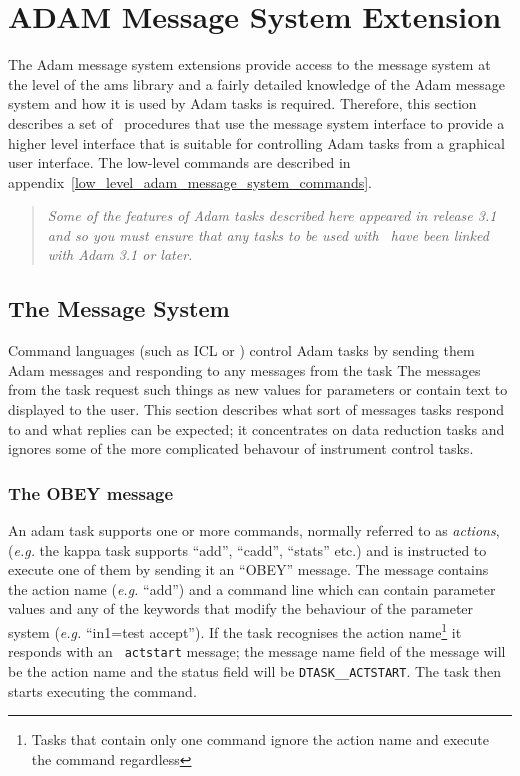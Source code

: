 \section{\label{adam_message_system_extension}ADAM Message System Extension}

The Adam message system extensions provide access to the message system 
at the level of the ams library and a fairly detailed knowledge 
of the Adam message system and how it is used by Adam tasks is required. 
Therefore, this section describes a set of \Tcl\ procedures that use the 
message system interface to provide a higher level interface that is 
suitable for controlling Adam tasks from a graphical user interface. The 
low-level commands are described in
appendix~\ref{low_level_adam_message_system_commands}.

\begin{quote}
{\em Some of the features of Adam tasks described here appeared in release
3.1 and so you must ensure that any tasks to be used with \Tcl\ have been
linked with Adam 3.1 or later.}
\end{quote}

\subsection{\label{message_system}The Message System}

Command languages (such as ICL or \TclTk ) control Adam tasks by
sending them Adam messages and responding to any messages from the task
The messages from the task request such things as new values for
parameters or contain text to displayed to the user.  This section
describes what sort of messages tasks respond to and what replies can
be expected; it concentrates on data reduction tasks and ignores some
of the more complicated behavour of instrument control tasks.

\subsubsection{The OBEY message}

An adam task supports one or more commands, normally referred to as
{\em actions}, ({\em{e.g.}} the kappa task supports ``add'', ``cadd'',
``stats'' etc.) and is instructed to execute one of them by sending it
an ``OBEY'' message. The message contains the action name ({\em{e.g.}} ``add'')
and a command line which can contain parameter values and any of the
keywords that modify the behaviour of the parameter system ({\em{e.g.}}
``in1=test accept''). If the task recognises the action
name\footnote{Tasks that contain only one command ignore the action
name and execute the command regardless} it responds with an {\tt
actstart} message; the message name field of the message will be the
action name and the status field will be {\tt DTASK\_\_ACTSTART}. The
task then starts executing the command.

